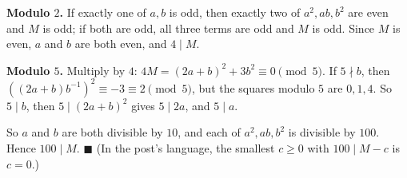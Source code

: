\textbf{Modulo $2$.} If exactly one of $a,b$ is odd, then exactly two of $a^2,ab,b^2$ are even and $M$ is odd; if both are odd, all three terms are odd and $M$ is odd. Since $M$ is even, $a$ and $b$ are both even, and $4\mid M$.

\textbf{Modulo $5$.} Multiply by $4$: $4M=(2a+b)^2+3b^2\equiv0\pmod5$. If $5\nmid b$, then $\left((2a+b)b^{-1}\right)^2\equiv-3\equiv2\pmod5$, but the squares modulo $5$ are $0,1,4$. So $5\mid b$, then $5\mid(2a+b)^2$ gives $5\mid2a$, and $5\mid a$.

So $a$ and $b$ are both divisible by $10$, and each of $a^2,ab,b^2$ is divisible by $100$. Hence $100\mid M$. $\blacksquare$ (In the post's language, the smallest $c\ge0$ with $100\mid M-c$ is $c=0$.)
